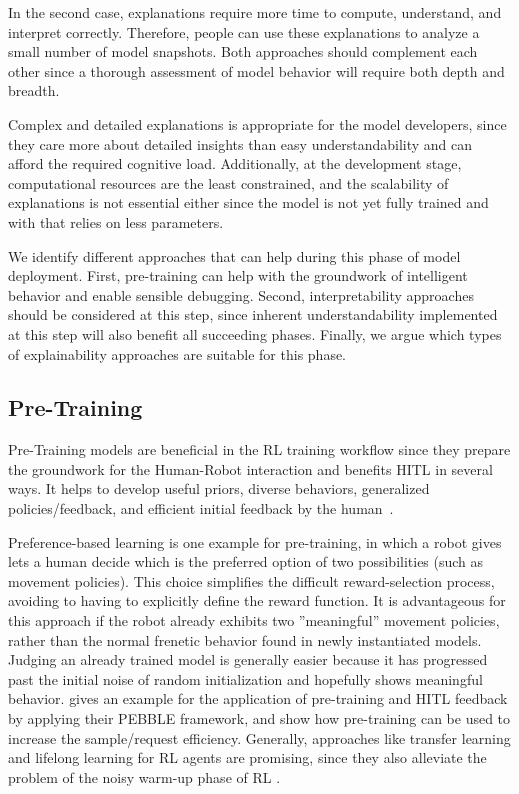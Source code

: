 \documentclass[twoside,11pt]{article}
\begin{document}
\begin{enumerate}
In the second case, explanations require more time to compute, understand, and interpret correctly. Therefore, people can use these explanations to analyze a small number of model snapshots.
Both approaches should complement each other since a thorough assessment of model behavior will require both depth and breadth.

Complex and detailed explanations is appropriate for the model developers, since they care more about detailed insights than easy understandability and can afford the required cognitive load. Additionally, at the development stage, computational resources are the least constrained, and the scalability of explanations is not essential either since the model is not yet fully trained and with that relies on less parameters.

We identify different approaches that can help during this phase of model deployment. First, pre-training can help with the groundwork of intelligent behavior and enable sensible debugging. Second, interpretability approaches should be considered at this step, since inherent understandability implemented at this step will also benefit all succeeding phases. Finally, we argue which types of explainability approaches are suitable for this phase.

\subsection{Pre-Training}
Pre-Training models are beneficial in the RL training workflow since they prepare the groundwork for the Human-Robot interaction and benefits HITL in several ways. It helps to 
develop useful priors, diverse behaviors, generalized policies/feedback, and efficient initial feedback by the human~\citep{daniel2016hierarchical,eysenbach2018diversity,florensa2017stochastic,hazan2019provably,LeeSmithAbbeel:2021:FeedbackPreferenceHITLLearningPEBBLE}.

Preference-based learning is one example for pre-training, in which a robot gives lets a human decide which is the preferred option of two possibilities (such as movement policies). This choice simplifies the difficult reward-selection process, avoiding to having to explicitly define the reward function. It is advantageous for this approach if the robot already exhibits two ''meaningful'' movement policies, rather than the normal frenetic behavior found in newly instantiated models.
Judging an already trained model is generally easier because it has progressed past the initial noise of random initialization and hopefully shows meaningful behavior. \citet{LeeSmithAbbeel:2021:FeedbackPreferenceHITLLearningPEBBLE} gives an example for the application of pre-training and HITL feedback by applying their PEBBLE framework, and show how pre-training can be used to increase the sample/request efficiency.
Generally, approaches like transfer learning and lifelong learning for RL agents are promising, since they also alleviate the problem of the noisy warm-up phase of RL \citep{taylor2009transfer,yang2021efficient}.


\end{enumerate}
\end{document}
